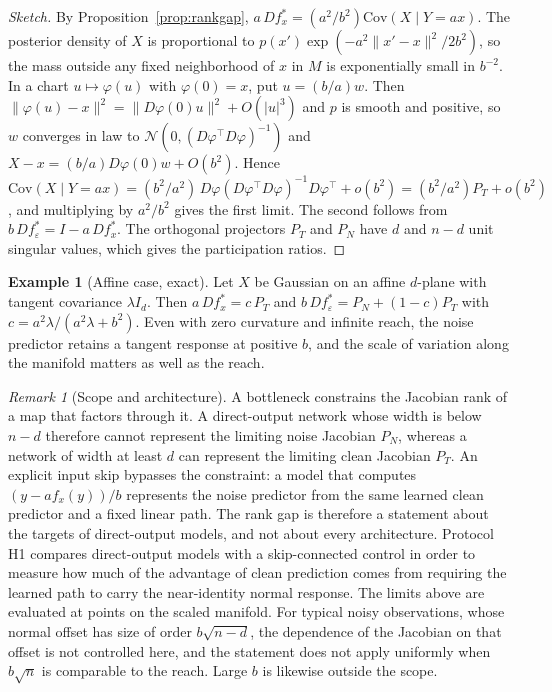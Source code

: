 \documentclass[11pt,a4paper]{article}
\theoremstyle{definition}
\newtheorem{example}[theorem]{Example}
\theoremstyle{remark}
\newtheorem{remark}[theorem]{Remark}
\begin{document}
\begin{proof}[Sketch]
By Proposition~\ref{prop:rankgap}, $a\,Df_x^\ast=(a^2/b^2)\mathrm{Cov}(X\mid Y=ax)$.
The posterior density of $X$ is proportional to
$p(x')\exp(-a^2\|x'-x\|^2/2b^2)$, so the mass outside any fixed neighborhood of
$x$ in $M$ is exponentially small in $b^{-2}$. In a chart $u\mapsto\varphi(u)$
with $\varphi(0)=x$, put $u=(b/a)w$. Then
$\|\varphi(u)-x\|^2=\|D\varphi(0)u\|^2+O(|u|^3)$ and $p$ is smooth and
positive, so $w$ converges in law to $\mathcal{N}(0,(D\varphi^\top D\varphi)^{-1})$
and $X-x=(b/a)D\varphi(0)w+O(b^2)$. Hence
$\mathrm{Cov}(X\mid Y=ax)=(b^2/a^2)\,D\varphi(D\varphi^\top D\varphi)^{-1}D\varphi^\top+o(b^2)
=(b^2/a^2)P_T+o(b^2)$, and multiplying by $a^2/b^2$ gives the first limit.
The second follows from $b\,Df_\varepsilon^\ast=I-a\,Df_x^\ast$. The orthogonal
projectors $P_T$ and $P_N$ have $d$ and $n-d$ unit singular values, which
gives the participation ratios.
\end{proof}

\begin{example}[Affine case, exact]\label{ex:affine}
Let $X$ be Gaussian on an affine $d$-plane with tangent covariance $\lambda I_d$.
Then $a\,Df_x^\ast=c\,P_T$ and $b\,Df_\varepsilon^\ast=P_N+(1-c)P_T$ with
$c=a^2\lambda/(a^2\lambda+b^2)$. Even with zero curvature and infinite reach,
the noise predictor retains a tangent response at positive $b$, and the scale
of variation along the manifold matters as well as the reach.
\end{example}

\begin{remark}[Scope and architecture]
A bottleneck constrains the Jacobian rank of a map that factors through it. A
direct-output network whose width is below $n-d$ therefore cannot represent
the limiting noise Jacobian $P_N$, whereas a network of width at least $d$ can
represent the limiting clean Jacobian $P_T$. An explicit input skip bypasses
the constraint: a model that computes $(y-af_x(y))/b$ represents the noise
predictor from the same learned clean predictor and a fixed linear path. The
rank gap is therefore a statement about the targets of direct-output models,
and not about every architecture. Protocol H1 compares direct-output models
with a skip-connected control in order to measure how much of the advantage of
clean prediction comes from requiring the learned path to carry the
near-identity normal response. The limits above are evaluated at points on
the scaled manifold. For typical noisy observations, whose normal offset has
size of order $b\sqrt{n-d}$, the dependence of the Jacobian on that offset is
not controlled here, and the statement does not apply uniformly when
$b\sqrt n$ is comparable to the reach. Large $b$ is likewise outside the
scope.
\end{remark}
\end{document}
